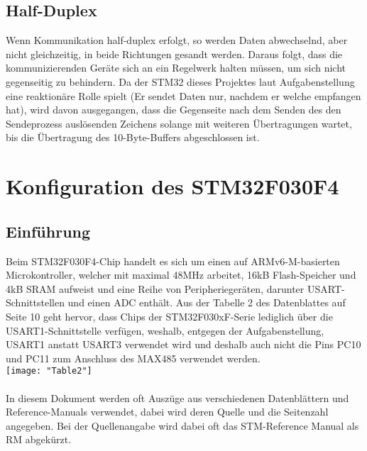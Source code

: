 \documentclass[11pt]{report}
\begin{document}
	\section{Half-Duplex}
		Wenn Kommunikation half-duplex erfolgt, so werden Daten abwechselnd, aber nicht gleichzeitig, in beide Richtungen gesandt werden. Daraus folgt, dass die kommunizierenden Geräte sich an ein Regelwerk halten müssen, um sich nicht gegenseitig zu behindern. Da der STM32 dieses Projektes laut Aufgabenstellung eine reaktionäre Rolle spielt (Er sendet Daten nur, nachdem er welche empfangen hat), wird davon ausgegangen, dass die Gegenseite nach dem Senden des den Sendeprozess auslösenden Zeichens solange mit weiteren Übertragungen wartet, bis die Übertragung des 10-Byte-Buffers abgeschlossen ist.
	\chapter{Konfiguration des STM32F030F4}
	\section{Einführung}
		Beim STM32F030F4-Chip handelt es sich um einen auf ARMv6-M-basierten Microkontroller, welcher mit maximal 48MHz arbeitet, 16kB Flash-Speicher und 4kB SRAM aufweist und eine Reihe von Peripheriegeräten, darunter USART-Schnittstellen und einen ADC enthält. Aus der Tabelle 2 des Datenblattes auf Seite 10 geht hervor, dass Chips der STM32F030xF-Serie lediglich über die USART1-Schnittstelle verfügen, weshalb, entgegen der Aufgabenstellung, USART1 anstatt USART3 verwendet wird und deshalb auch nicht die Pins PC10 und PC11 zum Anschluss des MAX485 verwendet werden.\\
		\texttt{[image: "Table2"]}\\
		\\In diesem Dokument werden oft Auszüge aus verschiedenen Datenblättern und Reference-Manuals verwendet, dabei wird deren Quelle und die Seitenzahl angegeben. Bei der Quellenangabe wird dabei oft das STM-Reference Manual als RM abgekürzt.
\end{document}
